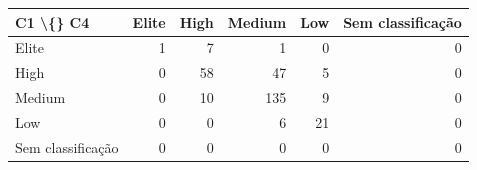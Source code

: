 \begin{tabular}{lrrrrr}
\hline
C1 \textbackslash\{\} C4 & Elite & High & Medium & Low & Sem classificação \\
\hline
Elite & 1 & 7 & 1 & 0 & 0 \\
High & 0 & 58 & 47 & 5 & 0 \\
Medium & 0 & 10 & 135 & 9 & 0 \\
Low & 0 & 0 & 6 & 21 & 0 \\
Sem classificação & 0 & 0 & 0 & 0 & 0 \\
\hline
\end{tabular}
